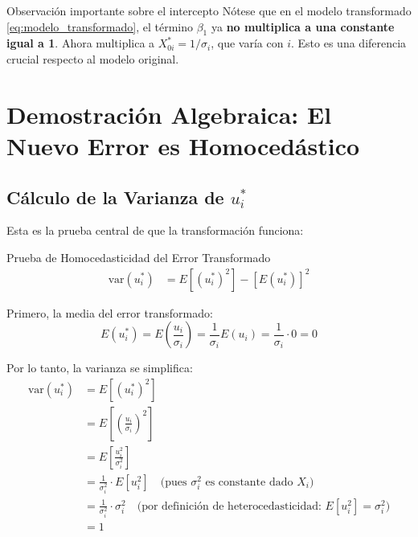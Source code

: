 \documentclass[12pt,a4paper]{article}
\begin{document}
\begin{nota}{Observación importante sobre el intercepto}
Nótese que en el modelo transformado \eqref{eq:modelo_transformado}, el término $\beta_1$ ya \textbf{no multiplica a una constante igual a 1}. Ahora multiplica a $X_{0i}^* = 1/\sigma_i$, que varía con $i$. Esto es una diferencia crucial respecto al modelo original.
\end{nota}

\section{Demostración Algebraica: El Nuevo Error es Homocedástico}

\subsection{Cálculo de la Varianza de $u_i^*$}

Esta es la prueba central de que la transformación funciona:

\begin{resultado}{Prueba de Homocedasticidad del Error Transformado}
\begin{align}
\text{var}(u_i^*) &= E\left[(u_i^*)^2\right] - \left[E(u_i^*)\right]^2
\end{align}

Primero, la media del error transformado:
\begin{equation}
E(u_i^*) = E\left(\frac{u_i}{\sigma_i}\right) = \frac{1}{\sigma_i} E(u_i) = \frac{1}{\sigma_i} \cdot 0 = 0
\end{equation}

Por lo tanto, la varianza se simplifica:
\begin{align}
\text{var}(u_i^*) &= E\left[(u_i^*)^2\right] \\[6pt]
&= E\left[\left(\frac{u_i}{\sigma_i}\right)^2\right] \\[6pt]
&= E\left[\frac{u_i^2}{\sigma_i^2}\right] \\[6pt]
&= \frac{1}{\sigma_i^2} \cdot E\left[u_i^2\right] \quad \text{(pues $\sigma_i^2$ es constante dado $X_i$)} \\[6pt]
&= \frac{1}{\sigma_i^2} \cdot \sigma_i^2 \quad \text{(por definición de heterocedasticidad: $E[u_i^2]=\sigma_i^2$)} \\[6pt]
&= \boxed{1}
\end{align}
\end{resultado}
\end{document}
